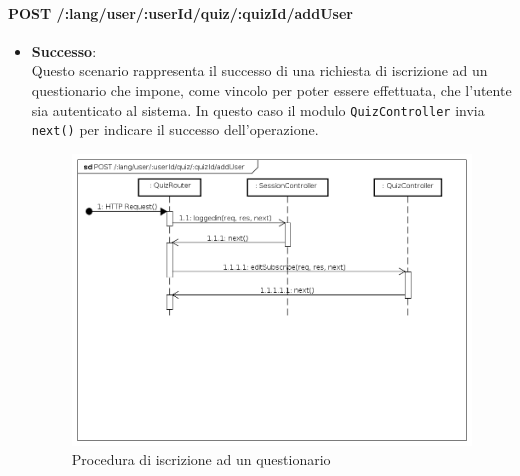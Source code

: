 \paragraph{POST /:lang/user/:userId/quiz/:quizId/addUser} %
\begin{itemize}
\item \textbf{Successo}:\\
Questo scenario rappresenta il successo di una richiesta di iscrizione ad un questionario che impone, come vincolo per poter essere effettuata, che l'utente sia autenticato al sistema. In questo caso il modulo \texttt{QuizController} invia \texttt{next()} per indicare il successo dell'operazione.
\label{Procedura di iscrizione ad un questionario}
\begin{figure}[ht]
	\centering
	\includegraphics[scale=0.40]{UML/DiagrammiDiSequenza/Back-end/POST__lang_user_userId_quiz_quizId_addUser_success.png}
	\caption{Procedura di iscrizione ad un questionario}
\end{figure}
\FloatBarrier


\end{itemize}
